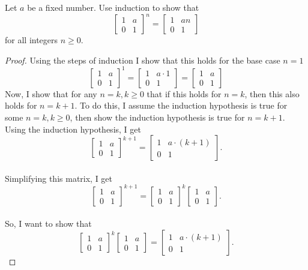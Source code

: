 \documentclass[titlepage]{article}
\newenvironment{problem}[2][Problem]{\begin{trivlist}
\item[\hskip \labelsep {\bfseries #1}\hskip \labelsep {\bfseries #2.}]}{\end{trivlist}}
\begin{document}
\begin{problem}{5}
Let $a$ be a fixed number. Use induction to show that
$$\begin{bmatrix} 1 & a \\ 0 & 1 \end{bmatrix}^{n}=\begin{bmatrix} 1 & an \\ 0 & 1 \end{bmatrix}$$
for all integers $ n \geq 0$.
\begin{proof}
Using the steps of induction I show that this holds for the base case $n=1$
$$\begin{bmatrix} 1 & a \\ 0 & 1 \end{bmatrix}^{1} = \begin{bmatrix} 1 & a\cdot1 \\ 0 & 1 \end{bmatrix} = \begin{bmatrix} 1 & a \\ 0 & 1 \end{bmatrix}$$
Now, I show that for any $n= k, k \geq 0$ that if this holds for $n=k$, then this also holds for $n=k+1$. To do this, I assume the induction hypothesis is true for some $n=k, k\geq 0$, then show the induction hypothesis is true for $n=k+1$. Using the induction hypothesis, I get
\\
$$
\begin{bmatrix} 1 & a \\ 0 & 1 \end{bmatrix}^{k+1} = \begin{bmatrix} 1 & a\cdot(k+1) \\ 0 & 1 \end{bmatrix}.
$$
\\ Simplifying this matrix, I get
$$
\begin{bmatrix} 1 & a \\ 0 & 1 \end{bmatrix}^{k+1} = \begin{bmatrix} 1 & a \\ 0 & 1 \end{bmatrix}^{k} \begin{bmatrix} 1 & a \\ 0 & 1 \end{bmatrix}.
$$
\\ So, I want to show that 
$$
\begin{bmatrix} 1 & a \\ 0 & 1 \end{bmatrix}^{k}  \begin{bmatrix} 1 & a \\ 0 & 1 \end{bmatrix} =  \begin{bmatrix} 1 & a\cdot(k+1) \\ 0 & 1 \end{bmatrix}.
$$
\end{proof}
\end{problem}
\end{document}
